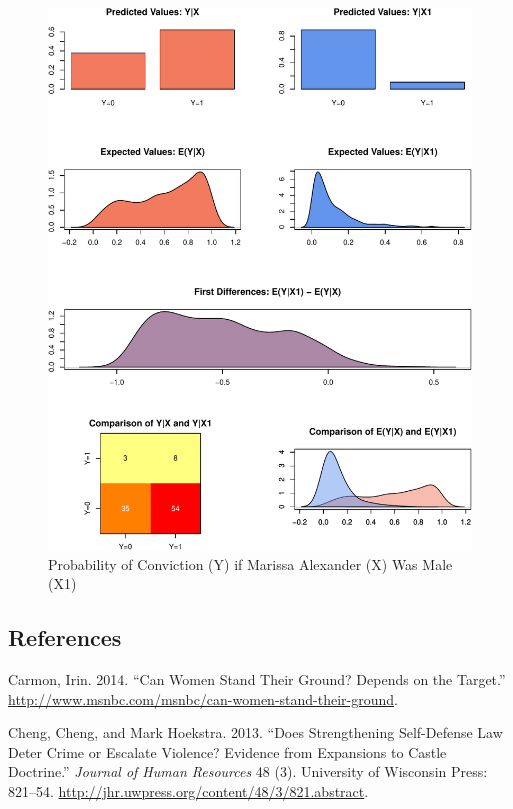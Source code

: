 \documentclass[12pt,article]{article}
\begin{document}
\begin{figure}[htbp]
\centering
\includegraphics{stand_your_ground_article_files/figure-latex/unnamed-chunk-8.pdf}
\caption{Probability of Conviction (Y) if Marissa Alexander (X) Was Male
(X1)}
\end{figure}

\pagebreak

\subsection*{References}\label{references}

Carmon, Irin. 2014. ``Can Women Stand Their Ground? Depends on the
Target.'' \url{http://www.msnbc.com/msnbc/can-women-stand-their-ground}.

Cheng, Cheng, and Mark Hoekstra. 2013. ``Does Strengthening Self-Defense
Law Deter Crime or Escalate Violence? Evidence from Expansions to Castle
Doctrine.'' \emph{Journal of Human Resources} 48 (3). University of
Wisconsin Press: 821--54.
\url{http://jhr.uwpress.org/content/48/3/821.abstract}.
\end{document}
